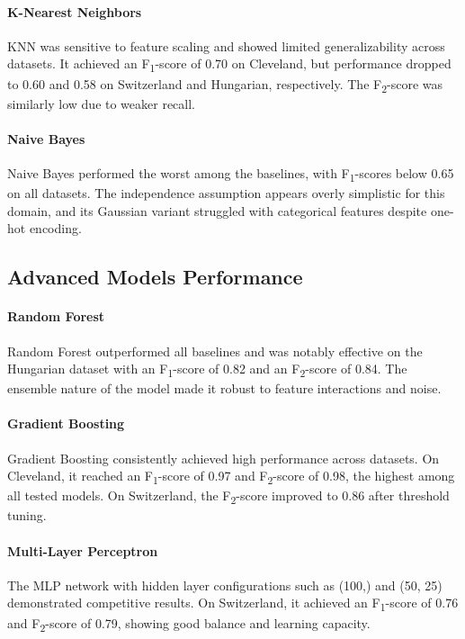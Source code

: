 \documentclass{article}
\begin{document}
\paragraph{K-Nearest Neighbors}
KNN was sensitive to feature scaling and showed limited generalizability across datasets. It achieved an F\textsubscript{1}-score of 0.70 on Cleveland, but performance dropped to 0.60 and 0.58 on Switzerland and Hungarian, respectively. The F\textsubscript{2}-score was similarly low due to weaker recall.

\paragraph{Naive Bayes}
Naive Bayes performed the worst among the baselines, with F\textsubscript{1}-scores below 0.65 on all datasets. The independence assumption appears overly simplistic for this domain, and its Gaussian variant struggled with categorical features despite one-hot encoding.

\subsection{Advanced Models Performance}

\paragraph{Random Forest}
Random Forest outperformed all baselines and was notably effective on the Hungarian dataset with an F\textsubscript{1}-score of 0.82 and an F\textsubscript{2}-score of 0.84. The ensemble nature of the model made it robust to feature interactions and noise.

\paragraph{Gradient Boosting}
Gradient Boosting consistently achieved high performance across datasets. On Cleveland, it reached an F\textsubscript{1}-score of 0.97 and F\textsubscript{2}-score of 0.98, the highest among all tested models. On Switzerland, the F\textsubscript{2}-score improved to 0.86 after threshold tuning.

\paragraph{Multi-Layer Perceptron}
The MLP network with hidden layer configurations such as (100,) and (50, 25) demonstrated competitive results. On Switzerland, it achieved an F\textsubscript{1}-score of 0.76 and F\textsubscript{2}-score of 0.79, showing good balance and learning capacity.
\end{document}
